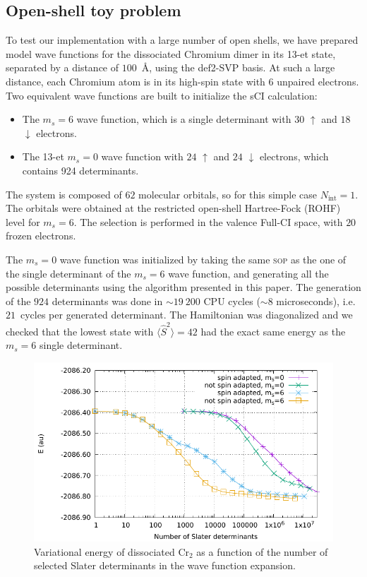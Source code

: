 \documentclass[aip,jcp,reprint,showkeys]{revtex4-1}
\newcommand{\stwo}{\hat{S}^2}
\newcommand{\up}{\uparrow}
\newcommand{\dn}{\downarrow}
\newcommand{\Nint}{{N_\text{int}}}
\newcommand{\sop}{\textsc{sop}}
\begin{document}
\subsection{Open-shell toy problem}

To test our implementation with a large number of open shells, we have prepared
model wave functions for the dissociated Chromium dimer in its 13-et state, separated by a
distance of $100$~\AA, using the def2-SVP basis.\cite{Weigend_2005}
At such a large distance, each Chromium atom is in its high-spin state with $6$
unpaired electrons. Two equivalent wave functions are built to initialize the sCI
calculation:
\begin{itemize}
\item The $m_s=6$ wave function, which is a single determinant with $30$ $\up$
      and $18$ $\dn$ electrons.
\item The 13-et $m_s=0$ wave function with $24$ $\up$ and $24$ $\dn$ electrons, which
      contains 924 determinants.
\end{itemize}
The system is composed of $62$ molecular orbitals, so for this simple case $\Nint=1$.
The orbitals were obtained at the restricted open-shell Hartree-Fock (ROHF) level
for $m_s=6$.
The selection is performed in the valence Full-CI space, with $20$ frozen electrons.

The $m_s=0$ wave function was initialized by taking the same {\sop} as the
one of the single determinant of the $m_s=6$ wave function, and generating all
the possible determinants using the algorithm presented in this paper.
The generation of the $924$ determinants was done in $\sim 19~200$
CPU cycles ($\sim8$ microseconds), i.e.  $21$~cycles per generated determinant. The Hamiltonian was
diagonalized and we checked that the lowest state with $\langle \stwo \rangle =
42$ had the exact same energy as the $m_s=6$ single determinant.

\begin{figure}
\includegraphics[width=0.9\columnwidth]{e_var_ndet}
\caption{Variational energy of dissociated Cr$_2$ as a function of the number of
selected Slater determinants in the wave function expansion.}
\label{fig:e_var_ndet}
\end{figure}
\end{document}
